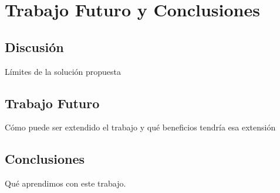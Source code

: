 \label{ch:trabajoFuturo}
\chapter{Trabajo Futuro y Conclusiones}
\section{Discusión}
Límites de la solución propuesta 

\section{Trabajo Futuro}
Cómo puede ser extendido el trabajo y qué beneficios tendría esa extensión 

\section{Conclusiones}
Qué aprendimos con este trabajo.  